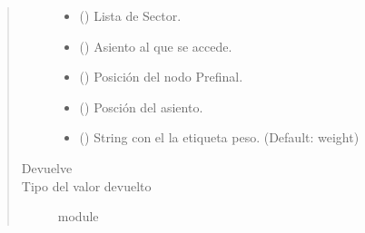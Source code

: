 \documentclass[letterpaper,10pt,spanish]{sphinxmanual}
\begin{document}
\begin{fulllineitems}
\begin{quote}
\begin{description}
\begin{itemize}
\item {} 
\sphinxAtStartPar
{} () \textendash{} Lista de Sector.

\item {} 
\sphinxAtStartPar
{} ({\hyperref[\detokenize{Clases:Clases.Asiento}]{}}) \textendash{} Asiento al que se accede.

\item {} 
\sphinxAtStartPar
{} () \textendash{} Posición del nodo Prefinal.

\item {} 
\sphinxAtStartPar
{} () \textendash{} Posción del asiento.

\item {} 
\sphinxAtStartPar
{} (\sphinxstyleliteralemphasis{\sphinxupquote{, }}) \textendash{} String con el la etiqueta peso. (Default: weight)

\end{itemize}

\item[{Devuelve}] \leavevmode
\sphinxAtStartPar
{}

\item[{Tipo del valor devuelto}] \leavevmode
\sphinxAtStartPar
module

\end{description}\end{quote}

\end{fulllineitems}

\end{document}
